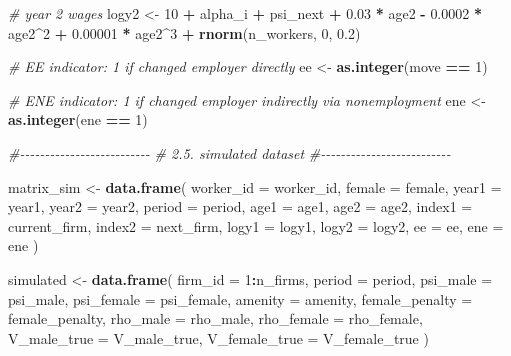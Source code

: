 \documentclass[
]{article}
\newenvironment{Shaded}{\begin{snugshade}}{\end{snugshade}}
\newcommand{\AttributeTok}[1]{\textcolor[rgb]{0.13,0.29,0.53}{#1}}
\newcommand{\CommentTok}[1]{\textcolor[rgb]{0.56,0.35,0.01}{\textit{#1}}}
\newcommand{\DecValTok}[1]{\textcolor[rgb]{0.00,0.00,0.81}{#1}}
\newcommand{\FloatTok}[1]{\textcolor[rgb]{0.00,0.00,0.81}{#1}}
\newcommand{\FunctionTok}[1]{\textcolor[rgb]{0.13,0.29,0.53}{\textbf{#1}}}
\newcommand{\NormalTok}[1]{#1}
\newcommand{\OtherTok}[1]{\textcolor[rgb]{0.56,0.35,0.01}{#1}}
\newcommand{\SpecialCharTok}[1]{\textcolor[rgb]{0.81,0.36,0.00}{\textbf{#1}}}
\begin{document}
\begin{Shaded}
\begin{Highlighting}[]
        \CommentTok{\# year 2 wages}
\NormalTok{        logy2 }\OtherTok{\textless{}{-}} \DecValTok{10} \SpecialCharTok{+}\NormalTok{ alpha\_i }\SpecialCharTok{+}\NormalTok{ psi\_next }\SpecialCharTok{+}
            \FloatTok{0.03} \SpecialCharTok{*}\NormalTok{ age2 }\SpecialCharTok{{-}} \FloatTok{0.0002} \SpecialCharTok{*}\NormalTok{ age2}\SpecialCharTok{\^{}}\DecValTok{2} \SpecialCharTok{+} \FloatTok{0.00001} \SpecialCharTok{*}\NormalTok{ age2}\SpecialCharTok{\^{}}\DecValTok{3} \SpecialCharTok{+}
            \FunctionTok{rnorm}\NormalTok{(n\_workers, }\DecValTok{0}\NormalTok{, }\FloatTok{0.2}\NormalTok{)}

        \CommentTok{\# EE indicator: 1 if changed employer directly}
\NormalTok{        ee }\OtherTok{\textless{}{-}} \FunctionTok{as.integer}\NormalTok{(move }\SpecialCharTok{==} \DecValTok{1}\NormalTok{)}

        \CommentTok{\# ENE indicator: 1 if changed employer indirectly via nonemployment}
\NormalTok{        ene }\OtherTok{\textless{}{-}} \FunctionTok{as.integer}\NormalTok{(ene }\SpecialCharTok{==} \DecValTok{1}\NormalTok{)}

        \CommentTok{\#{-}{-}{-}{-}{-}{-}{-}{-}{-}{-}{-}{-}{-}{-}{-}{-}{-}{-}{-}{-}{-}{-}{-}{-}{-}{-}}
        \CommentTok{\# 2.5. simulated dataset}
        \CommentTok{\#{-}{-}{-}{-}{-}{-}{-}{-}{-}{-}{-}{-}{-}{-}{-}{-}{-}{-}{-}{-}{-}{-}{-}{-}{-}{-}}

\NormalTok{        matrix\_sim }\OtherTok{\textless{}{-}} \FunctionTok{data.frame}\NormalTok{(}
            \AttributeTok{worker\_id =}\NormalTok{ worker\_id,}
            \AttributeTok{female =}\NormalTok{ female,}
            \AttributeTok{year1 =}\NormalTok{ year1,}
            \AttributeTok{year2 =}\NormalTok{ year2,}
            \AttributeTok{period =}\NormalTok{ period,}
            \AttributeTok{age1 =}\NormalTok{ age1,}
            \AttributeTok{age2 =}\NormalTok{ age2,}
            \AttributeTok{index1 =}\NormalTok{ current\_firm,}
            \AttributeTok{index2 =}\NormalTok{ next\_firm,}
            \AttributeTok{logy1 =}\NormalTok{ logy1,}
            \AttributeTok{logy2 =}\NormalTok{ logy2,}
            \AttributeTok{ee =}\NormalTok{ ee,}
            \AttributeTok{ene =}\NormalTok{ ene}
\NormalTok{        )}

\NormalTok{        simulated }\OtherTok{\textless{}{-}} \FunctionTok{data.frame}\NormalTok{(}
            \AttributeTok{firm\_id =} \DecValTok{1}\SpecialCharTok{:}\NormalTok{n\_firms,}
            \AttributeTok{period =}\NormalTok{ period,}
            \AttributeTok{psi\_male =}\NormalTok{ psi\_male,}
            \AttributeTok{psi\_female =}\NormalTok{ psi\_female,}
            \AttributeTok{amenity =}\NormalTok{ amenity,}
            \AttributeTok{female\_penalty =}\NormalTok{ female\_penalty,}
            \AttributeTok{rho\_male =}\NormalTok{ rho\_male,}
            \AttributeTok{rho\_female =}\NormalTok{ rho\_female,}
            \AttributeTok{V\_male\_true =}\NormalTok{ V\_male\_true,}
            \AttributeTok{V\_female\_true =}\NormalTok{ V\_female\_true}
\NormalTok{        )}


\end{Highlighting}
\end{Shaded}
\end{document}
